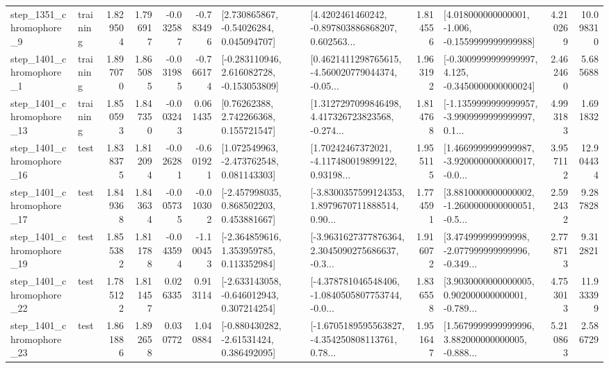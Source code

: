 \begin{tabular}{llrrrrllrlrr}
  step\_1351\_chromophore\_9 &  training &      1.829504 &    1.796917 &     -0.032587 & -0.783496 &     [2.730865867, -0.54026284, 0.045094707] &  [4.4202461460242, -0.897803886868207, 0.602563... &       1.814556 &   [4.018000000000001, -1.006, -0.1559999999999988] &            4.210269 &         10.098310 \\
  step\_1401\_chromophore\_1 &  training &      1.897070 &    1.865085 &     -0.031985 & -0.766174 &   [-0.283110946, 2.616082728, -0.153053809] &  [0.4621411298765615, -4.560020779044374, -0.05... &       1.963192 &  [-0.3009999999999997, 4.125, -0.3450000000000024] &            2.462460 &          5.685688 \\
 step\_1401\_chromophore\_13 &  training &      1.850593 &    1.847350 &     -0.003243 &  0.061435 &      [0.76262388, 2.742266368, 0.155721547] &  [1.3127297099846498, 4.417326723823568, -0.274... &       1.814768 &  [-1.1359999999999957, -3.9909999999999997, 0.1... &            4.993183 &          1.691832 \\
 step\_1401\_chromophore\_16 &      test &      1.838375 &    1.812094 &     -0.026281 & -0.601921 &    [1.072549963, -2.473762548, 0.081143303] &  [1.70242467372021, -4.117480019899122, 0.93198... &       1.955115 &  [1.4669999999999987, -3.9200000000000017, -0.0... &            3.957112 &         12.904434 \\
 step\_1401\_chromophore\_17 &      test &      1.849368 &    1.843634 &     -0.005735 & -0.010302 &    [-2.457998035, 0.868502203, 0.453881667] &  [-3.8300357599124353, 1.8979670711888514, 0.90... &       1.774591 &  [3.8810000000000002, -1.2600000000000051, -0.5... &            2.592432 &          9.287828 \\
 step\_1401\_chromophore\_19 &      test &      1.855382 &    1.811788 &     -0.043594 & -1.100453 &    [-2.364859616, 1.353959785, 0.113352984] &  [-3.9631627377876364, 2.3045090275686637, -0.3... &       1.916072 &  [3.474999999999998, -2.077999999999996, -0.349... &            2.778713 &          9.312821 \\
 step\_1401\_chromophore\_22 &      test &      1.785122 &    1.811457 &      0.026335 &  0.913114 &   [-2.633143058, -0.646012943, 0.307214254] &  [-4.378781046548406, -1.0840505807753744, -0.0... &       1.836558 &  [3.9030000000000005, 0.902000000000001, -0.789... &            4.753013 &         11.933399 \\
 step\_1401\_chromophore\_23 &      test &      1.861886 &    1.892658 &      0.030772 &  1.040884 &    [-0.880430282, -2.61531424, 0.386492095] &  [-1.6705189595563827, -4.354250808113761, 0.78... &       1.951647 &  [1.5679999999999996, 3.882000000000005, -0.888... &            5.210863 &          2.586729 \\

\end{tabular}
